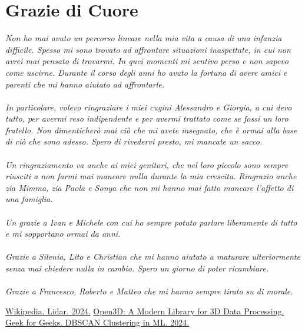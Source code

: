 \documentclass[italian]{report}
\begin{document}
\newpage
\chapter*{Grazie di Cuore}
{\ssfamily\textit{
Non ho mai avuto un percorso lineare nella mia vita a causa di una infanzia difficile. Spesso mi sono trovato ad affrontare situazioni inaspettate, in cui non avrei mai pensato di trovarmi. In quei momenti mi sentivo perso e non sapevo come uscirne. Durante il corso degli anni ho avuto la fortuna di avere amici e parenti che mi hanno aiutato ad affrontarle.\\
\\
In particolare, volevo ringraziare i miei cugini Alessandro e Giorgia, a cui devo tutto, per avermi reso indipendente e per avermi trattato come se fossi un loro fratello. Non dimenticherò mai ciò che mi avete insegnato, che è ormai alla base di ciò che sono adesso. Spero di rivedervi presto, mi mancate un sacco.\\
\\
Un ringraziamento va anche ai miei genitori, che nel loro piccolo sono sempre riusciti a non farmi mai mancare nulla durante la mia crescita. Ringrazio anche zia Mimma, zia Paola e Sonya che non mi hanno mai fatto mancare l'affetto di una famiglia.\\
\\
Un grazie a Ivan e Michele con cui ho sempre potuto parlare liberamente di tutto e mi sopportano ormai da anni.\\
\\
Grazie a Silenia, Lito e Christian che mi hanno aiutato a maturare ulteriormente senza mai chiedere nulla in cambio. Spero un giorno di poter ricambiare.\\
\\
Grazie a Francesco, Roberto e Matteo che mi hanno sempre tirato su di morale.
}}

\newpage
\begin{thebibliography}{9}
	 \href{https://it.wikipedia.org/wiki/Lidar}{Wikipedia. Lidar. 2024.}
	 \href{http://www.open3d.org/}{Open3D: A Modern Library for 3D Data Processing.}
	 \href{https://www.geeksforgeeks.org/dbscan-clustering-in-ml-density-based-clustering/}{Geek for Geeks. DBSCAN Clustering in ML. 2024.}
\end{thebibliography}
\end{document}
